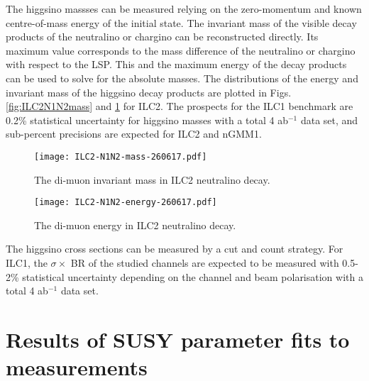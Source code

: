 \documentclass{PoS}
\begin{document}
The higgsino massses can be measured relying on the zero-momentum and known centre-of-mass energy 
of the initial state. 
The invariant mass of the visible decay products of the neutralino or chargino can be reconstructed directly. 
Its maximum value corresponds to the mass difference of the neutralino or chargino with respect to the LSP. 
This and the maximum energy of the decay products can be used to solve for the absolute masses. 
The distributions of the energy and invariant mass of the higgsino decay products are plotted in 
Figs. \ref{fig:ILC2N1N2mass} and \ref{fig:ILC2N1N2energy} for ILC2. 
The prospects for the ILC1 benchmark are 0.2\% statistical uncertainty for higgsino masses 
with a total 4 ab$^{-1}$ data set, and sub-percent precisions are expected for ILC2 and nGMM1.
%
\begin{figure}[htbp]
 \begin{minipage}{0.48\linewidth}
  \begin{center}
    \texttt{[image: ILC2-N1N2-mass-260617.pdf]}
  \end{center}
  \caption{The di-muon invariant mass in ILC2 neutralino decay.}
\label{fig:ILC2N1N2mass}
 \end{minipage}
 \hfill
 \begin{minipage}{0.48\linewidth}
  \begin{center}
    \texttt{[image: ILC2-N1N2-energy-260617.pdf]}
      \end{center}
 \caption{The di-muon energy in ILC2 neutralino decay.}
 \label{fig:ILC2N1N2energy}
 \end{minipage}
\end{figure}


The higgsino cross sections can be measured by a cut and count strategy. 
For ILC1, the $\sigma \times$ BR of the studied channels are expected to be measured with 0.5-2\% statistical uncertainty 
depending on the channel and beam polarisation with a total 4 ab$^{-1}$ data set. 

\section{Results of SUSY parameter fits to measurements}
\end{document}
